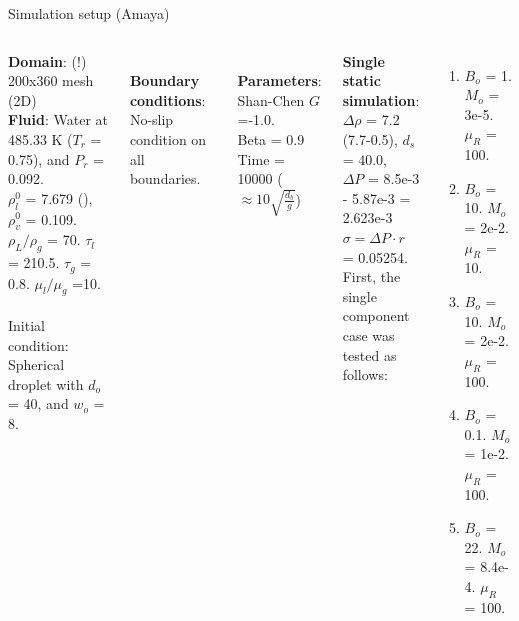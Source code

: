 \documentclass[8pt]{beamer}
\begin{document}
	\begin{frame}[t]{Simulation setup (Amaya)}
		\justifying
		\begin{columns}[t]
			
			\textbf{Domain}: (!) 200x360 mesh (2D)\\
			\textbf{Fluid}: Water at 485.33 K ($T_r$ = 0.75), and $P_r$ = 0.092. \\$\rho_l^0$  = 7.679 (), $\rho_v^0$  = 0.109. $\rho_L/\rho_g$ = 70. $\tau_l$ = 210.5. $\tau_g$ = 0.8. $\mu_l/\mu_g$ =10.\\~\\
			Initial condition: Spherical droplet with $d_o$ = 40, and $w_o$ = 8.
			
			~\\
			\textbf{Boundary conditions}: No-slip condition on all boundaries.
			
			~\\
			\textbf{Parameters}: Shan-Chen $G$=-1.0. \\
			Beta = 0.9\\
			Time = 10000 ($\approx 10 \sqrt{\frac{d_b}{g}}$)\\
			~\\
			
			
			
			
			
			\textbf{Single static simulation}:\\ $\Delta \rho $ = 7.2 (7.7-0.5), $d_s$ = 40.0, \\ $\Delta P$ = 8.5e-3 - 5.87e-3 = 2.623e-3 \\$\sigma = \Delta P \cdot r$ = 0.05254.\\
			
			
			First, the single component case was tested as follows:
			\begin{enumerate}
				\item $B_o$ = 1. $M_o$ = 3e-5. $\mu_R$ = 100. 
				\item $B_o$ = 10. $M_o$ = 2e-2. $\mu_R$ = 10.
				\item $B_o$ = 10. $M_o$ = 2e-2. $\mu_R$ = 100. 
				\item $B_o$ = 0.1. $M_o$ = 1e-2. $\mu_R$ = 100.
				\item $B_o$ = 22. $M_o$ = 8.4e-4. $\mu_R$ = 100. 
			\end{enumerate}
		\end{columns}
	\end{frame}
	
\end{document}
